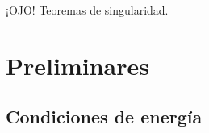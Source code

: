\documentclass{article}
\numberwithin{equation}{section}
\theoremstyle{definition}
\begin{document}
¡OJO! Teoremas de singularidad.

\section{\label{preliminaries section} Preliminares}

%
%
%
%
%
%
%
%
%
%

\subsection{Condiciones de energía}
\end{document}
